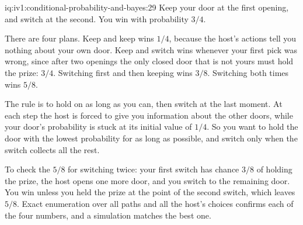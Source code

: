 \begin{solution}{iq:iv1:conditional-probability-and-bayes:29}
Keep your door at the first opening, and switch at the second. You win with probability $3/4$.

There are four plans. Keep and keep wins $1/4$, because the host's actions tell you nothing about your own door. Keep and switch wins whenever your first pick was wrong, since after two openings the only closed door that is not yours must hold the prize: $3/4$. Switching first and then keeping wins $3/8$. Switching both times wins $5/8$.

The rule is to hold on as long as you can, then switch at the last moment. At each step the host is forced to give you information about the other doors, while your door's probability is stuck at its initial value of $1/4$. So you want to hold the door with the lowest probability for as long as possible, and switch only when the switch collects all the rest.

To check the $5/8$ for switching twice: your first switch has chance $3/8$ of holding the prize, the host opens one more door, and you switch to the remaining door. You win unless you held the prize at the point of the second switch, which leaves $5/8$. Exact enumeration over all paths and all the host's choices confirms each of the four numbers, and a simulation matches the best one.

\end{solution}

